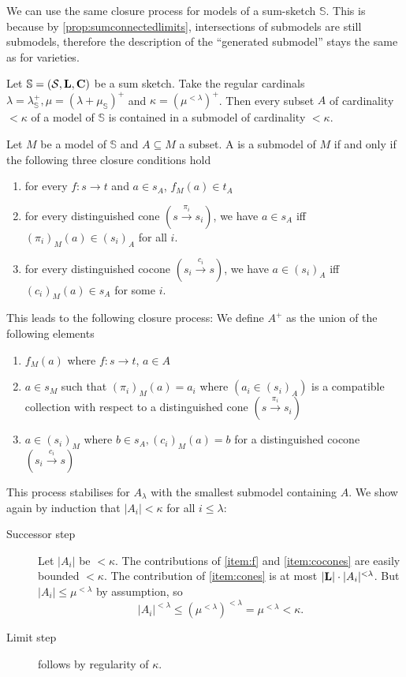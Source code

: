 We can use the same closure process for models of a sum-sketch $\mathbb S$. This is because by \ref{prop:sumconnectedlimits}, intersections of submodels are still submodels, therefore the description of the ``generated submodel'' stays the same as for varieties.
\begin{Proposition}
Let $\mathbb S = (\mathcal{S}, \textbf{L}, \textbf{C})$ be a sum sketch. Take the regular cardinals $\lambda = \lambda^+_\mathbb S, \mu = (\lambda + \mu_\mathbb S)^+$ and $\kappa = (\mu^{< \lambda})^+$. Then every subset $A$ of cardinality $< \kappa$ of a model of $\mathbb S$ is contained in a submodel of cardinality $< \kappa$.
\end{Proposition}
\begin{Proof}
Let $M$ be a model of $\mathbb S$ and $A \subseteq M$ a subset. A is a submodel of $M$ if and only if the following three closure conditions hold
\begin{enumerate}
\item\label{item:f} for every $f : s \to t$ and $a \in s_A$, $f_M(a) \in t_A$
\item\label{item:cones} for every distinguished cone $(s \xrightarrow{\pi_i} s_i)$, we have $a \in s_A$ iff $(\pi_i)_M(a) \in (s_i)_A$ for all $i$.
\item\label{item:cocones} for every distinguished cocone $(s_i \xrightarrow{c_i} s)$, we have $a \in (s_i)_A$ iff $(c_i)_M(a) \in s_A$ for some $i$.
\end{enumerate}
This leads to the following closure process: We define $A^+$ as the union of the following elements
\begin{enumerate}
\item $f_M(a)$ where $f : s \to t$, $a \in A$
\item $a \in s_M$ such that $(\pi_i)_M(a) = a_i$ where $(a_i \in (s_i)_A)$ is a compatible collection with respect to a distinguished cone $(s \xrightarrow{\pi_i} s_i)$
\item $a \in (s_i)_M$ where $b \in s_A, (c_i)_M(a) = b$ for a distinguished cocone  $(s_i \xrightarrow{c_i} s)$
\end{enumerate}
This process stabilises for $A_\lambda$ with the smallest submodel containing $A$. We show again by induction that $|A_i| < \kappa$ for all $i \leq \lambda$: 
\begin{description}
\item[Successor step] Let $|A_i|$ be $< \kappa$. The contributions of \ref{item:f} and \ref{item:cocones} are easily bounded $< \kappa$. The contribution of \ref{item:cones} is at most $|\textbf{L}|\cdot |A_i|^{< \lambda}$. But $|A_i| \leq \mu^{< \lambda}$ by assumption, so \[ |A_i|^{< \lambda} \leq \left(\mu^{< \lambda}\right)^{< \lambda} = \mu^{< \lambda} < \kappa. \]
\item[Limit step] follows by regularity of $\kappa$.
\end{description}
\end{Proof}

